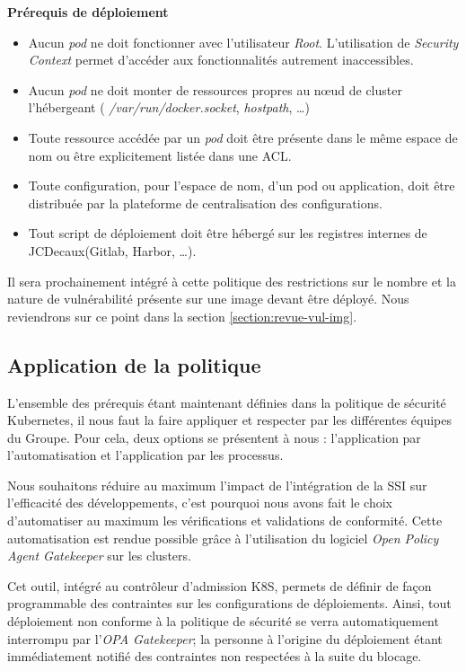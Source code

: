 \newpage

\textbf{Prérequis de déploiement}
\begin{itemize}
    \item Aucun \emph{pod} ne doit fonctionner avec l'utilisateur \emph{Root}. L'utilisation de \emph{Security Context} 
    permet d'accéder aux fonctionnalités autrement inaccessibles.
    \item Aucun \emph{pod} ne doit monter de ressources propres au nœud de cluster l'hébergeant (\ie 
    \emph{/var/run/docker.socket}, \emph{hostpath}, \dots)
    \item Toute ressource accédée par un \emph{pod} doit être présente dans le même espace de nom ou être explicitement 
    listée dans une \ac{ACL}.
    \item Toute configuration, pour l'espace de nom, d'un pod ou application, doit être distribuée par la plateforme de 
    centralisation des configurations.
    \item Tout script de déploiement doit être hébergé sur les registres internes de JCDecaux(\ie Gitlab, Harbor, \dots).
\end{itemize}

Il sera prochainement intégré à cette politique des restrictions sur le nombre et la nature de vulnérabilité présente 
sur une image devant être déployé. Nous reviendrons sur ce point dans la section \ref{section:revue-vul-img}.
\subsection{Application de la politique}
L'ensemble des prérequis étant maintenant définies dans la politique de sécurité Kubernetes, il nous faut la faire 
appliquer et respecter par les différentes équipes du Groupe.
\newline Pour cela, deux options se présentent à nous : l'application par l'automatisation et l'application par les
processus.

Nous souhaitons réduire au maximum l'impact de l'intégration de la \ac{SSI} sur l'efficacité des développements, c'est 
pourquoi nous avons fait le choix d'automatiser au maximum les vérifications et validations de conformité.
\newline Cette automatisation est rendue possible grâce à l'utilisation du logiciel \emph{Open Policy Agent Gatekeeper}
sur les clusters.

Cet outil, intégré au contrôleur d'admission \ac{K8S}, permets de définir de façon programmable des contraintes sur les
configurations de déploiements. Ainsi, tout déploiement non conforme à la politique de sécurité se verra automatiquement 
interrompu par l'\emph{OPA Gatekeeper}; la personne à l'origine du déploiement étant immédiatement notifié des 
contraintes non respectées à la suite du blocage.

